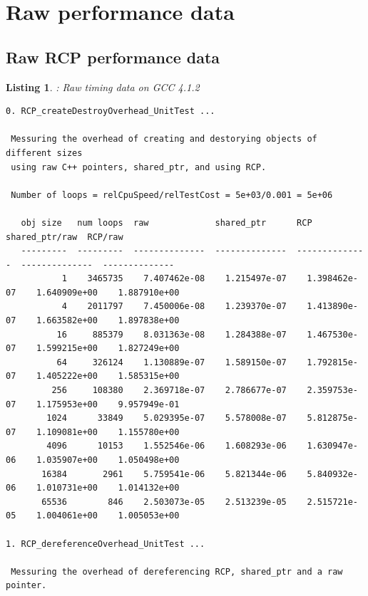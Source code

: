 \documentclass[pdf,ps2pdf,11pt]{SANDreport}
\newtheorem{listing}{Listing}
\begin{document}
%
{}\section{Raw performance data}
\label{apdx:raw-perf-data}
%

%
{}\subsection{Raw RCP performance data}
\label{apdx:raw-rcp-perf-data}
%

\begin{listing}: Raw {} timing data on GCC 4.1.2  \\
\label{listing:RCP-GCC-Timings}
{\scriptsize\begin{verbatim}
0. RCP_createDestroyOverhead_UnitTest ... 
 
 Messuring the overhead of creating and destorying objects of different sizes
 using raw C++ pointers, shared_ptr, and using RCP.
 
 Number of loops = relCpuSpeed/relTestCost = 5e+03/0.001 = 5e+06
 
   obj size   num loops  raw             shared_ptr      RCP             shared_ptr/raw  RCP/raw       
   ---------  ---------  --------------  --------------  --------------  --------------  --------------
           1    3465735    7.407462e-08    1.215497e-07    1.398462e-07    1.640909e+00    1.887910e+00
           4    2011797    7.450006e-08    1.239370e-07    1.413890e-07    1.663582e+00    1.897838e+00
          16     885379    8.031363e-08    1.284388e-07    1.467530e-07    1.599215e+00    1.827249e+00
          64     326124    1.130889e-07    1.589150e-07    1.792815e-07    1.405222e+00    1.585315e+00
         256     108380    2.369718e-07    2.786677e-07    2.359753e-07    1.175953e+00    9.957949e-01
        1024      33849    5.029395e-07    5.578008e-07    5.812875e-07    1.109081e+00    1.155780e+00
        4096      10153    1.552546e-06    1.608293e-06    1.630947e-06    1.035907e+00    1.050498e+00
       16384       2961    5.759541e-06    5.821344e-06    5.840932e-06    1.010731e+00    1.014132e+00
       65536        846    2.503073e-05    2.513239e-05    2.515721e-05    1.004061e+00    1.005053e+00

1. RCP_dereferenceOverhead_UnitTest ... 
 
 Messuring the overhead of dereferencing RCP, shared_ptr and a raw pointer.
 

\end{verbatim}}
\end{listing}
\end{document}
